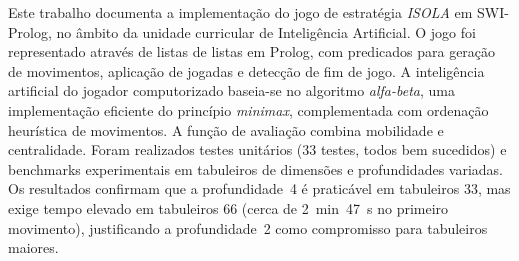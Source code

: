 \abstractPT  %

Este trabalho documenta a implementa\c{c}\~{a}o do jogo de estrat\'{e}gia \textit{ISOLA} em
SWI-Prolog, no \^{a}mbito da unidade curricular de Intelig\^{e}ncia Artificial.
O jogo foi representado atrav\'{e}s de listas de listas em Prolog, com
predicados para gera\c{c}\~{a}o de movimentos, aplica\c{c}\~{a}o de jogadas e
detec\c{c}\~{a}o de fim de jogo. A intelig\^{e}ncia artificial do jogador
computorizado baseia-se no algoritmo \textit{alfa-beta}, uma implementa\c{c}\~{a}o
eficiente do princ\'{i}pio \textit{minimax}, complementada com ordena\c{c}\~{a}o
heur\'{i}stica de movimentos. A fun\c{c}\~{a}o de avalia\c{c}\~{a}o combina mobilidade
e centralidade. Foram realizados testes unit\'{a}rios (33 testes, todos bem
sucedidos) e benchmarks experimentais em tabuleiros de dimens\~{o}es e
profundidades variadas. Os resultados confirmam que a profundidade~4
\'{e} praticável em tabuleiros 3{\texttimes}3, mas exige tempo elevado
em tabuleiros 6{\texttimes}6 (cerca de 2~min~47~s no primeiro
movimento), justificando a profundidade~2 como compromisso para
tabuleiros maiores.
